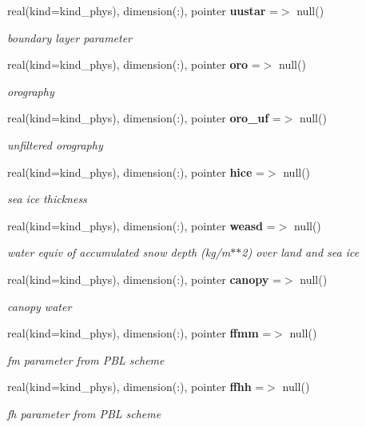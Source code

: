 \begin{DoxyCompactItemize}
real(kind=kind\+\_\+phys), dimension(\+:), pointer \textbf{ uustar} =$>$ null()
\begin{DoxyCompactList}\small\item\em boundary layer parameter \end{DoxyCompactList}\item 
real(kind=kind\+\_\+phys), dimension(\+:), pointer \textbf{ oro} =$>$ null()
\begin{DoxyCompactList}\small\item\em orography \end{DoxyCompactList}\item 
real(kind=kind\+\_\+phys), dimension(\+:), pointer \textbf{ oro\+\_\+uf} =$>$ null()
\begin{DoxyCompactList}\small\item\em unfiltered orography \end{DoxyCompactList}\item 
real(kind=kind\+\_\+phys), dimension(\+:), pointer \textbf{ hice} =$>$ null()
\begin{DoxyCompactList}\small\item\em sea ice thickness \end{DoxyCompactList}\item 
real(kind=kind\+\_\+phys), dimension(\+:), pointer \textbf{ weasd} =$>$ null()
\begin{DoxyCompactList}\small\item\em water equiv of accumulated snow depth (kg/m$\ast$$\ast$2) over land and sea ice \end{DoxyCompactList}\item 
real(kind=kind\+\_\+phys), dimension(\+:), pointer \textbf{ canopy} =$>$ null()
\begin{DoxyCompactList}\small\item\em canopy water \end{DoxyCompactList}\item 
real(kind=kind\+\_\+phys), dimension(\+:), pointer \textbf{ ffmm} =$>$ null()
\begin{DoxyCompactList}\small\item\em fm parameter from P\+BL scheme \end{DoxyCompactList}\item 
real(kind=kind\+\_\+phys), dimension(\+:), pointer \textbf{ ffhh} =$>$ null()
\begin{DoxyCompactList}\small\item\em fh parameter from P\+BL scheme \end{DoxyCompactList}\item 

\end{DoxyCompactItemize}
